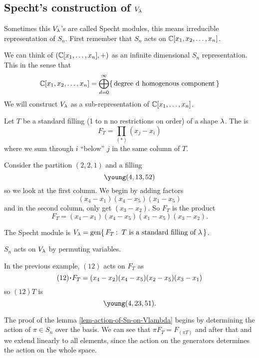 \documentclass[12pt]{memoir}
\begin{document}
\subsection{Specht's construction of $V_\lambda$}

Sometimes this $V_\lambda$'s are called Specht modules, this means irreducible representation of $S_n$. First remember that $S_n$ acts on $\mathbb{C}[x_1,x_2,\dots,x_n]$.\par 
We can think of $(\mathbb{C}[x_1,\dots,x_n],+)$ as an infinite dimensional $S_n$ representation. This in the sense that 
$$\mathbb{C}[x_1,x_2,\dots,x_n]=\bigoplus_{d=0}^\infty\{\,\text{degree d homogenous component}\,\}$$
We will construct $V_\lambda$ as a sub-representation of $\mathbb{C}[x_1,\dots,x_n]$.

\begin{Def}
    Let $T$ be a standard filling (1 to n no restrictions on order) of a shape $\lambda$. The  is 
    $$F_T=\prod_{(\ast)}(x_j-x_i)$$
    where we sum through $i$ ``below'' $j$ in the same column of $T$.
\end{Def}

\begin{Ex}
    Consider the partition $(2,2,1)$ and a filling
    $$\young(4,13,52)$$
    so we look at the first column. We begin by adding factors 
    $$(x_4-x_1)(x_4-x_5)(x_1-x_5)$$
    and in the second column, only get $(x_3-x_2)$. So $F_T$ is the product
    $$F_{T}=(x_4-x_1)(x_4-x_5)(x_1-x_5)(x_3-x_2).$$
\end{Ex}

\begin{Def}
    The Specht module is $V_\la=\gen\set{F_T\:\ T\text{ is a standard filling of }\la}$.
\end{Def}

\begin{Lem}\label{lem-action-of-Sn-on-Vlambda}
    $S_n$ acts on $V_\lambda$ by permuting variables.
\end{Lem}

\begin{Ex}
    In the previous example, $(12)$ acts on $F_T$ as 
    $$(12)\.F_T=(x_4-x_2)(x_4-x_5)(x_2-x_5)(x_3-x_1)$$
    so $(12)T$ is 
    $$\young(4,23,51).$$
\end{Ex}

The proof of the lemma \ref{lem-action-of-Sn-on-Vlambda} begins by determining the action of $\pi\in S_n$ over the basis. We can see that $\pi F_T=F_{(\pi T)}$ and after that and we extend linearly to all elements, since the action on the generators determines the action on the whole space.
\end{document}
